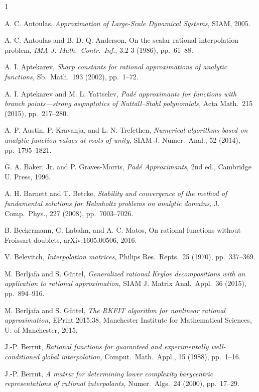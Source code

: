 \documentclass[final]{siamltex}
\begin{document}
\begin{thebibliography}{1}

{\sc A. C. Antoulas,} {\em Approximation of Large-Scale Dynamical Systems},
SIAM, 2005.

{\sc A. C. Antoulas and B. D. Q. Anderson,}
On the scalar rational interpolation problem,
{\em IMA J. Math.\ Contr.\ Inf.}, 3.2-3 (1986), pp.~61--88. 

{\sc A. I. Aptekarev,} {\em Sharp constants for
rational approximations of analytic functions,}
Sb.\ Math.\ 193 (2002), pp.~1--72.

{\sc A. I. Aptekarev and M. L. Yattselev,} 
{\em Pad\'e approximants for functions with
branch points---strong asymptotics of Nuttall--Stahl
polynomials,} Acta Math.\ 215 (2015), pp.~217--280.

{\sc A. P. Austin, P. Kravanja, and L. N. Trefethen,}
{\em Numerical algorithms based on analytic function
values at roots of unity,} SIAM J. Numer.\ Anal., 52 (2014),
pp.~1795--1821.

{\sc G. A. Baker, Jr. and P. Graves-Morris,}
{\em Pad\'e Approximants,} 2nd ed., Cambridge U. Press, 1996.

{\sc A. H. Barnett and T. Betcke,}
{\em Stability and convergence of the method of
fundamental solutions for Helmholtz problems on analytic
domains,} J. Comp.\ Phys., 227 (2008), pp.~7003--7026.

{\sc B. Beckermann, G. Labahn, and A. C. Matos,}
On rational functions without Froissart doub\-lets,
arXiv:1605.00506, 2016.

{\sc V. Belevitch,} {\em Interpolation matrices,}
Philips Res.\ Repts.\ 25 (1970), pp.~337--369.

{\sc M. Berljafa and S. G\"uttel,} {\em Generalized
rational Krylov decompositions with an application to
rational approximation,}
SIAM J. Matrix Anal.\ Appl.\ 36 (2015), pp.~894--916.

{\sc M. Berljafa and S. G\"uttel,} {\em The
RKFIT algorithm for nonlinear rational approximation,}
EPrint 2015.38, Manchester Institute for Mathematical
Sciences, U. of Manchester, 2015.

{\sc J.-P. Berrut,}
{\em Rational functions for guaranteed and experimentally
well-conditioned global interpolation,} Comput.\ Math.\ Appl., 15
(1988), pp.~1--16.

{\sc J.-P. Berrut,}
{\em A matrix for determining lower complexity
barycentric representations of rational interpolants,}
Numer.\ Algs.\ 24 (2000), pp.~17--29.


\end{thebibliography}
\end{document}
